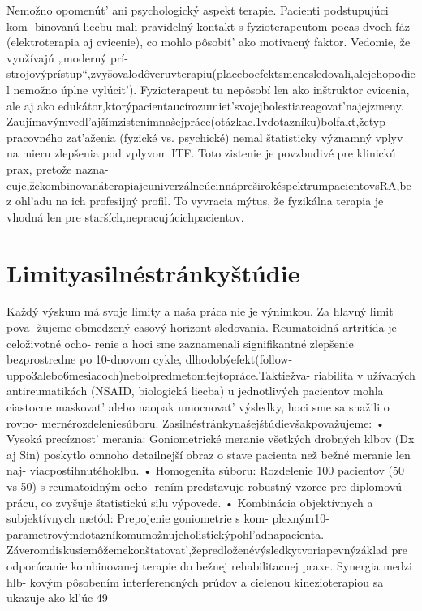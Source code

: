 Nemožno opomenút’ ani psychologický aspekt terapie. Pacienti podstupujúci kom- binovanú liecbu mali pravidelný kontakt s fyzioterapeutom pocas dvoch fáz (elektroterapia aj cvicenie), co mohlo pôsobit’ ako motivacný faktor. Vedomie, že využívajú „moderný prí- strojovýprístup“,zvyšovalodôveruvterapiu(placeboefektsmenesledovali,alejehopodiel nemožno úplne vylúcit’). Fyzioterapeut tu nepôsobí len ako inštruktor cvicenia, ale aj ako edukátor,ktorýpacientaucírozumiet’svojejbolestiareagovat’najejzmeny. Zaujímavýmvedl’ajšímzistenímnašejpráce(otázkac.1vdotazníku)bolfakt,žetyp pracovného zat’aženia (fyzické vs. psychické) nemal štatisticky významný vplyv na mieru zlepšenia pod vplyvom ITF. Toto zistenie je povzbudivé pre klinickú prax, pretože nazna- cuje,žekombinovanáterapiajeuniverzálneúcinnápreširokéspektrumpacientovsRA,bez ohl’adu na ich profesijný profil. To vyvracia mýtus, že fyzikálna terapia je vhodná len pre starších,nepracujúcichpacientov.


\section{Limityasilnéstránkyštúdie}

Každý výskum má svoje limity a naša práca nie je výnimkou. Za hlavný limit pova- žujeme obmedzený casový horizont sledovania. Reumatoidná artritída je celoživotné ocho- renie a hoci sme zaznamenali signifikantné zlepšenie bezprostredne po 10-dnovom cykle, dlhodobýefekt(follow-uppo3alebo6mesiacoch)nebolpredmetomtejtopráce.Taktiežva- riabilita v užívaných antireumatikách (NSAID, biologická liecba) u jednotlivých pacientov mohla ciastocne maskovat’ alebo naopak umocnovat’ výsledky, hoci sme sa snažili o rovno- mernérozdeleniesúboru. Zasilnéstránkynašejštúdievšakpovažujeme: • Vysoká precíznost’ merania: Goniometrické meranie všetkých drobných klbov (Dx aj Sin) poskytlo omnoho detailnejší obraz o stave pacienta než bežné meranie len naj- viacpostihnutéhoklbu. • Homogenita súboru: Rozdelenie 100 pacientov (50 vs 50) s reumatoidným ocho- rením predstavuje robustný vzorec pre diplomovú prácu, co zvyšuje štatistickú silu výpovede. • Kombinácia objektívnych a subjektívnych metód: Prepojenie goniometrie s kom- plexným10-parametrovýmdotazníkomumožnujeholistickýpohl’adnapacienta. Záveromdiskusiemôžemekonštatovat’,žepredloženévýsledkytvoriapevnýzáklad pre odporúcanie kombinovanej terapie do bežnej rehabilitacnej praxe. Synergia medzi hlb- kovým pôsobením interferencných prúdov a cielenou kinezioterapiou sa ukazuje ako kl’úc 49

